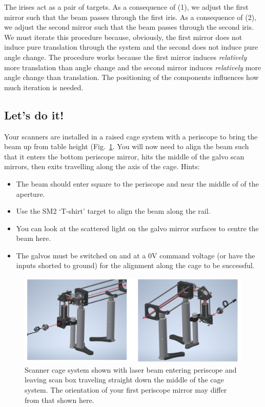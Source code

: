 \documentclass[a4paper]{report}
\begin{document}
The irises act as a pair of targets. 
As a consequence of (1), we adjust the first mirror such that the beam passes through the first iris. 
As a consequence of (2), we adjust the second mirror such that the beam passes through the second iris.
We must iterate this procedure because, obviously, the first mirror does not induce pure translation through the system and the second does not induce pure angle change. 
The procedure works because the first mirror induces \emph{relatively} more translation than angle change and the second mirror induces \emph{relatively} more angle change than translation. 
The positioning of the components influences how much iteration is needed.

\clearpage

\subsection{Let's do it!}
Your scanners are installed in a raised cage system with a periscope to bring the beam up from table height (Fig.~\ref{fig:beam_in_cage}. 
You will now need to align the beam such that it enters the bottom periscope mirror, hits the middle of the galvo scan mirrors, then exits travelling along the axis of the cage.
Hints:
\begin{itemize}
    \item The beam should enter square to the periscope and near the middle of of the aperture.
    \item Use the SM2 `T-shirt' target to align the beam along the rail. 
    \item You can look at the scattered light on the galvo mirror surfaces to centre the beam here. 
    \item The galvos must be switched on and at a 0V command voltage (or have the inputs shorted to ground) for the alignment along the cage to be successful. 
\end{itemize}


\begin{figure}[h]
\center
\includegraphics[width=6.5in]{./figures/beam_in_cage.png}
\caption{Scanner cage system shown with laser beam entering periscope and leaving scan box traveling straight down the middle of the cage system. The orientation of your first periscope mirror may differ from that shown here.}
\label{fig:beam_in_cage}
\end{figure}
\end{document}
